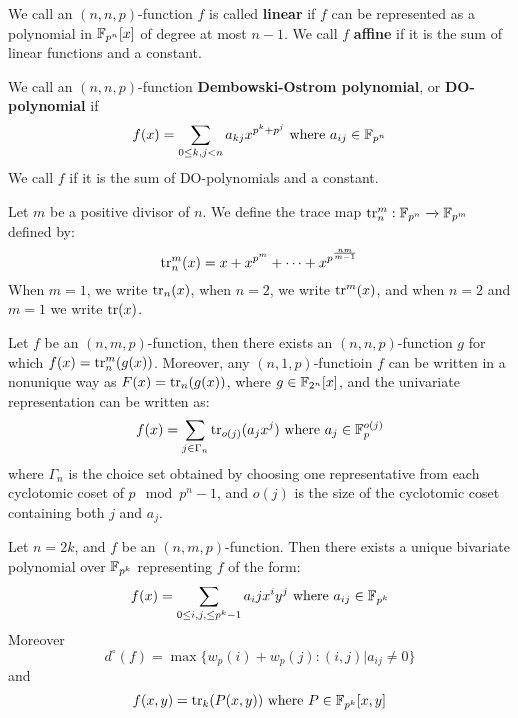 \begin{definition}
  We call an $(n,n,p)$-function $f$ is called \textbf{linear} if $f$ can be
  represented as a polynomial in $\mathbb{F}_{p^n}[x]$ of degree at most $n-1$. We call
   $f$ \textbf{affine} if it is the sum of linear functions and a constant.
\end{definition}

\begin{definition}
  We call an $(n,n,p)$-function \textbf{Dembowski-Ostrom polynomial}, or
  \textbf{DO-polynomial} if
  \begin{equation}\label{equation_1.4}
    f(x)=\sum_{0 \leq k,j<n}{a_{kj}x^{p^k+p^j}} \text{ where } a_{ij} \in
    \mathbb{F}_{p^n}
  \end{equation}
  We call $f$ if it is the sum of  DO-polynomials and a constant.
\end{definition}

\begin{defintion}
  Let $m$ be a positive divisor of $n$. We define the trace map
  $\operatorname{tr}_n^m:\mathbb{F}_{p^n} \xrightarrow{} \mathbb{F}_{p^m}$ defined by:
  \begin{equation*}
    \operatorname{tr}_n^m(x)=x+x^{p^m}+ \dots +x^{p^{\frac{nm}{m-1}}}
  \end{equation*}
  When $m=1$, we write $\operatorname{tr}_n(x)$, when $n=2$, we write $\operatorname{tr}^m(x)$, and when
  $n=2$ and $m=1$ we write $\operatorname{tr}(x)$.
\end{defintion}

\begin{lemma}\label{lemma_1.1.2}
  Let  $f$ be an $(n,m,p)$-function, then there exists an $(n,n,p)$-function $g$
  for which $f(x)=\operatorname{tr}_n^m(g(x))$. Moreover, any $(n,1,p)$-functioin $f$ can be
  written in a nonunique way as $F(x)=\operatorname{tr}_n(g(x))$, where $g \in \mathbb{F}_{2^n}[x]$,
  and the univariate representation can be written as:
  \begin{equation}\label{equation_1.5}
    f(x)=\sum_{j \in \Gamma_n}{\operatorname{tr}_{o(j)}(a_jx^j)} \text{ where } a_j \in
    \mathbb{F}_p^{o(j)}
  \end{equation}
  where $\Gamma_n$ is the choice set obtained by choosing one representative
  from each cyclotomic coset of $p \mod{p^n-1}$, and $o(j)$ is the size of the
  cyclotomic coset containing both $j$ and  $a_j$.
\end{lemma}

\begin{lemma}\label{1.1.3}
  Let $n=2k$, and $f$ be an $(n,m,p)$-function. Then there exists a unique
  bivariate polynomial over $\mathbb{F}_{p^k}$ representing $f$ of the form:
  \begin{equation}\label{equation_1.6}
    f(x)=\sum_{0 \leq i,j, \leq p^k-1}{a_ijx^iy^j} \text{ where } a_{ij} \in
    \mathbb{F}_{p^k}
  \end{equation}
  Moreover
  \begin{equation*}
    d^\circ(f)=\max{\{w_p(i)+w_p(j) : (i,j)|a_{ij} \neq 0\}}
  \end{equation*}
  and
  \begin{equation*}
    f(x,y)=\operatorname{tr}_k(P(x,y)) \text{ where } P \in \mathbb{F}_{p^k}[x,y]
  \end{equation*}
\end{lemma}

